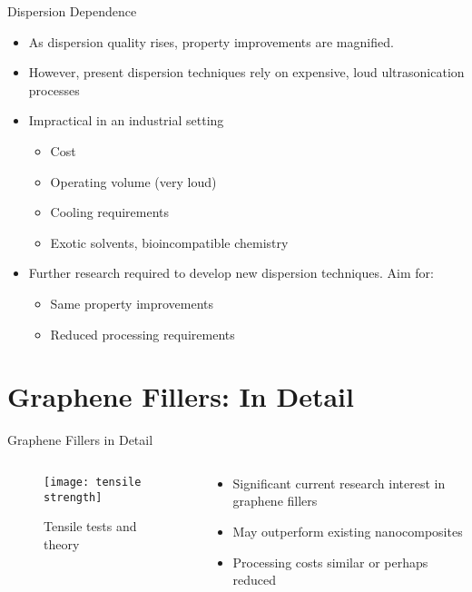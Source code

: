\documentclass[12pt,letterpaper]{beamer}
\begin{document}
\begin{frame}{Dispersion Dependence}
\begin{itemize}
\item As dispersion quality rises, property improvements are magnified.
\item However, present dispersion techniques rely on expensive, loud ultrasonication processes
\item Impractical in an industrial setting
\begin{itemize}
\item Cost
\item Operating volume (very loud)
\item Cooling requirements 
\item Exotic solvents, bioincompatible chemistry
\end{itemize} 
\item Further research required to develop new dispersion techniques. Aim for:
\begin{itemize}
\item Same property improvements
\item Reduced processing requirements
\end{itemize}
\end{itemize}
\end{frame}

\section{Graphene Fillers: In Detail}

\begin{frame}{Graphene Fillers in Detail}
  \begin{columns}[T]
      \begin{column}{.5\textwidth}
    \begin{block}{}
\begin{figure}
  \begin{center}
    \texttt{[image: tensile strength]}
  \end{center}
  \caption[Tensile strength improvements for graphene nanocomposites]{Tensile tests and theory}
\end{figure}
        \end{block}
    \end{column}
    \begin{column}{.5\textwidth}
     \begin{block}{}
\begin{itemize}
\item Significant current research interest in graphene fillers
\item May outperform existing nanocomposites
\item Processing costs similar or perhaps reduced 
\end{itemize}
    \end{block}
    \end{column}
  \end{columns}
\end{frame}
\end{document}
